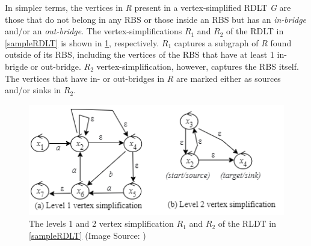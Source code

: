  In simpler terms, the vertices in \emph{R} present in a vertex-simplified RDLT \emph{G} are those that do not belong in any RBS or those inside an RBS but has an \emph{in-bridge} and/or an \emph{out-bridge}.
 The vertex-simplifications $R_1$ and $R_2$ of the RDLT in \ref{sampleRDLT} is shown in \ref{vertexSimplification}, respectively. $R_1$ captures a subgraph of $R$ found outside of its RBS, including the vertices of the RBS that have at least 1 in-brigde or out-bridge. $R_2$ vertex-simplification, however, captures the RBS itself. The vertices that have in- or out-bridges in $R$ are marked either as sources and/or sinks in $R_2$.
 \begin{figure}[H]
    \centering
    \includegraphics[]{../Figures/vertexSimplification.png}
    \caption{The levels 1 and 2 vertex simplification $R_1$ and $R_2$ of the RLDT in \ref{sampleRDLT} (Image Source: \cite{MalinaoWCTP2023})}
    \label{vertexSimplification}
\end{figure}
